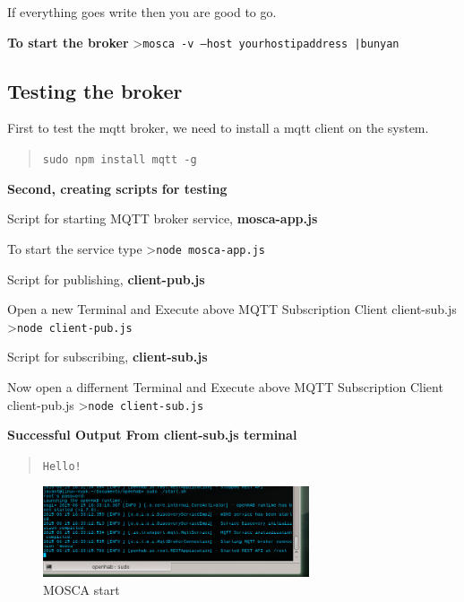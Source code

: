 \documentclass[16pt]{article}
\begin{document}
If everything goes write then you are good to go.

\vspace{0.3cm}

\textbf{To start the broker} \textgreater{}\texttt{mosca -v --host yourhostipaddress |bunyan}



\vspace{0.5cm}

\subsection{Testing the broker}

First to test the mqtt broker, we need to install a mqtt client on the
system.

\begin{quote}
	\texttt{sudo npm install mqtt -g}
\end{quote}

\textbf{Second, creating scripts for testing}

Script for starting MQTT broker service, \textbf{mosca-app.js}

To start the service type \textgreater{}\texttt{node mosca-app.js}

\vspace{0.5cm}
Script for publishing, \textbf{client-pub.js}

Open a new Terminal and Execute above MQTT Subscription Client
client-sub.js \textgreater{}\texttt{node client-pub.js}

\vspace{0.5cm}
Script for subscribing, \textbf{client-sub.js}

Now open a differnent Terminal and Execute above MQTT Subscription
Client client-pub.js \textgreater{}\texttt{node client-sub.js}

\vspace{0.5cm}
\textbf{Successful Output From client-sub.js terminal}

\begin{quote}
	\texttt{Hello!}
\end{quote}


\begin{figure}
	\hspace{2cm}
	\includegraphics[width=0.7\textwidth]{images/mosca.jpg}
	\caption{MOSCA start}
\end{figure}
\end{document}
